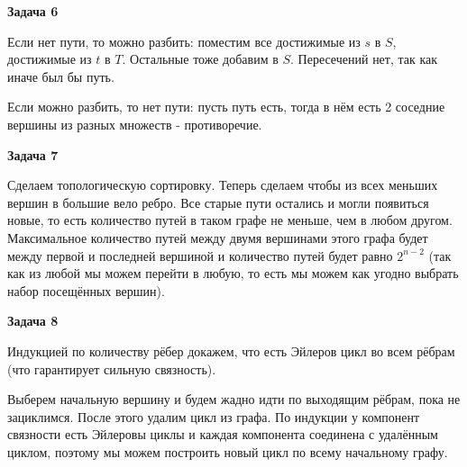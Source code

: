 \begin{center}
\textbf{Задача 6}
\end{center}
Если нет пути, то можно разбить: поместим все достижимые из $\displaystyle s$ в $\displaystyle S$, достижимые из $\displaystyle t$ в $\displaystyle T$. Остальные тоже добавим в $\displaystyle S$. Пересечений нет, так как иначе был бы путь.

Если можно разбить, то нет пути: пусть путь есть, тогда в нём есть 2 соседние вершины из разных множеств - противоречие.

\begin{center}
\textbf{Задача 7}
\end{center}
Сделаем топологическую сортировку. Теперь сделаем чтобы из всех меньших вершин в большие вело ребро. Все старые пути остались и могли появиться новые, то есть количество путей в таком графе не меньше, чем в любом другом. Максимальное количество путей между двумя вершинами этого графа будет между первой и последней вершиной и количество путей будет равно $\displaystyle 2^{n-2}$ (так как из любой мы можем перейти в любую, то есть мы можем как угодно выбрать набор посещённых вершин).

\begin{center}
\textbf{Задача 8}
\end{center}
Индукцией по количеству рёбер докажем, что есть Эйлеров цикл во всем рёбрам (что гарантирует сильную связность).

Выберем начальную вершину и будем жадно идти по выходящим рёбрам, пока не зациклимся. После этого удалим цикл из графа. По индукции у компонент связности есть Эйлеровы циклы и каждая компонента соединена с удалённым циклом, поэтому мы можем построить новый цикл по всему начальному графу. 